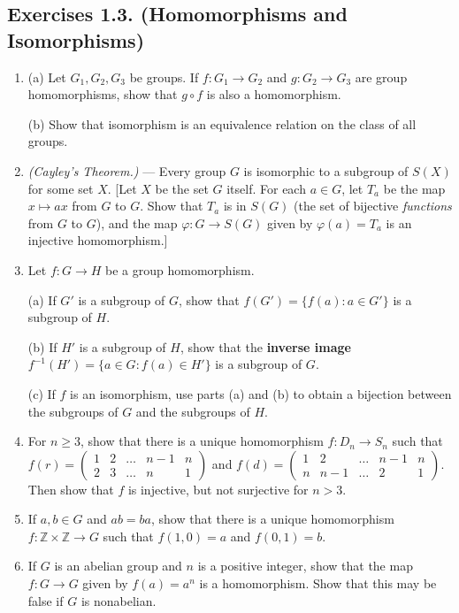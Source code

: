 \documentclass[leqno]{book}
\begin{document}
\subsection*{Exercises 1.3. (Homomorphisms and Isomorphisms)}
\begin{enumerate}
\item (a) Let $G_1,G_2,G_3$ be groups.  If $f:G_1\to G_2$ and $g:G_2\to G_3$ are group homomorphisms, show that $g\circ f$ is also a homomorphism.

(b) Show that isomorphism is an equivalence relation on the class of all groups.

\item\emph{(Cayley's Theorem.)} \---- Every group $G$ is isomorphic to a subgroup of $S(X)$ for some set $X$.  [Let $X$ be the set $G$ itself.  For each $a\in G$, let $T_a$ be the map $x\mapsto ax$ from $G$ to $G$.  Show that $T_a$ is in $S(G)$ (the set of bijective \emph{functions} from $G$ to $G$), and the map $\varphi:G\to S(G)$ given by $\varphi(a)=T_a$ is an injective homomorphism.]

\item Let $f:G\to H$ be a group homomorphism.

(a) If $G'$ is a subgroup of $G$, show that $f(G')=\{f(a):a\in G'\}$ is a subgroup of $H$.

(b) If $H'$ is a subgroup of $H$, show that the \textbf{inverse image} $f^{-1}(H')=\{a\in G:f(a)\in H'\}$ is a subgroup of $G$.

(c) If $f$ is an isomorphism, use parts (a) and (b) to obtain a bijection between the subgroups of $G$ and the subgroups of $H$.

\item For $n\geqslant 3$, show that there is a unique homomorphism $f:D_n\to S_n$ such that $f(r)=\begin{pmatrix}1&2&\dots&n-1&n\\2&3&\dots&n&1\end{pmatrix}$ and $f(d)=\begin{pmatrix}1&2&\dots&n-1&n\\n&n-1&\dots&2&1\end{pmatrix}$.  Then show that $f$ is injective, but not surjective for $n>3$.

\item If $a,b\in G$ and $ab=ba$, show that there is a unique homomorphism $f:\mathbb Z\times\mathbb Z\to G$ such that $f(1,0)=a$ and $f(0,1)=b$.

\item If $G$ is an abelian group and $n$ is a positive integer, show that the map $f:G\to G$ given by $f(a)=a^n$ is a homomorphism.  Show that this may be false if $G$ is nonabelian.


\end{enumerate}
\end{document}
